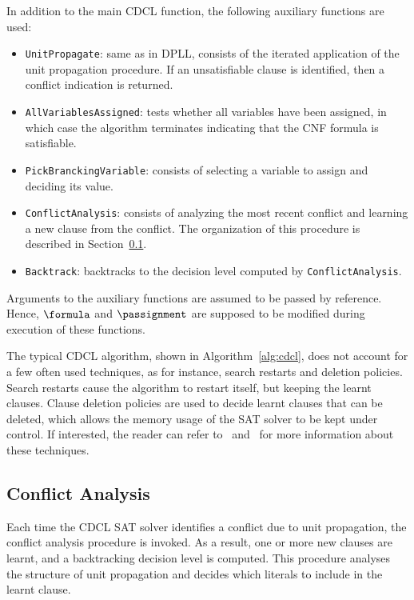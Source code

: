 In addition to the main CDCL function, the following auxiliary functions are
used:
\begin{itemize}
    \item \texttt{UnitPropagate}:
        same as in DPLL, consists of the iterated application of the unit
        propagation procedure. If an unsatisfiable clause is identified, then a
        conflict indication is returned.
    \item \texttt{AllVariablesAssigned}:
        tests whether all variables have been assigned, in which case the
        algorithm terminates indicating that the CNF formula is satisfiable. 
    \item \texttt{PickBranckingVariable}:
        consists of selecting a variable to assign and deciding its value.
    \item \texttt{ConflictAnalysis}:
        consists of analyzing the most recent conflict and learning a new clause
        from the conflict. The organization of this procedure is described in
        Section~\ref{sec:conflictanalysis}.
    \item \texttt{Backtrack}:
        backtracks to the decision level computed by \texttt{ConflictAnalysis}.
\end{itemize}

Arguments to the auxiliary functions are assumed to be passed by reference.
Hence, $\formula$ and $\passignment$ are supposed to be modified during execution
of these functions.

The typical CDCL algorithm, shown in Algorithm~\ref{alg:cdcl}, does not account
for a few often used techniques, as for instance, search restarts and deletion
policies. Search restarts cause the algorithm to restart itself, but keeping the
learnt clauses.  Clause deletion policies are used to decide learnt clauses that
can be deleted, which allows the memory usage of the SAT solver to be kept under
control. If interested, the reader can refer to~\cite{cdclchapter}
and~\cite{satchapter} for more information about these techniques.

\subsection{Conflict Analysis}%
\label{sec:conflictanalysis}

Each time the CDCL SAT solver identifies a conflict due to unit propagation, the
conflict analysis procedure is invoked. As a result, one or more new clauses are
learnt, and a backtracking decision level is computed. This procedure analyses
the structure of unit propagation and decides which literals to include in the
learnt clause.

